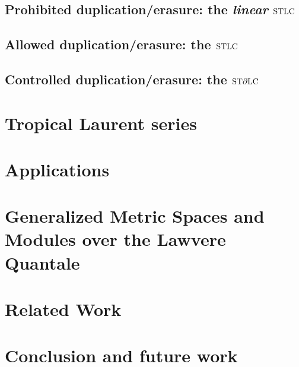 \documentclass[conference]{IEEEtran}
\begin{document}
\subsection{Prohibited duplication/erasure: the \emph{linear} $\mathrm{STLC}$}


\subsection{Allowed duplication/erasure: the $\mathrm{STLC}$}
%

\subsection{Controlled duplication/erasure: the $\mathrm{ST}\partial\mathrm{LC}$}
%


\section{Tropical Laurent series}
%


\section{Applications}\label{sec:app}
%


\section{Generalized Metric Spaces and Modules over the Lawvere Quantale}\label{sec:QMod}
%


\section{Related Work}



\section{Conclusion and future work}\label{sec:concl}

\end{document}
